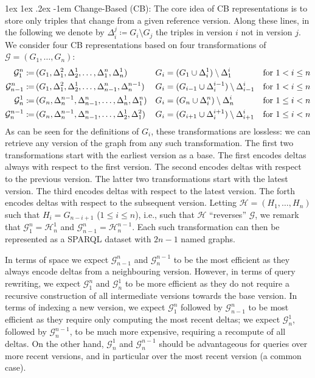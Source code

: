 \documentclass{llncs}
\makeatletter
\renewcommand\paragraph{\@startsection{paragraph}{4}{\z@}%
	{1ex \@plus1ex \@minus.2ex}%
	{-1em}%
	{\normalfont\normalsize\itshape}}
\newcommand{\da}{\ensuremath{:\nolinebreak\mkern-1.2mu\nolinebreak=}}
\makeatother
\begin{document}
\paragraph{Change-Based (CB):} The core idea of CB representations is to store only triples that change from a given reference version. Along these lines, in the following we denote by $\Delta_{i}^j \coloneqq G_i \setminus G_j$ the triples in version $i$ not in version $j$. We consider four CB representations based on four transformations of $\mathcal{G} = (G_1,\ldots,G_n)$:
%
{\footnotesize
\begin{align*}
\mathcal{G}^n_1 \da\,& (G_1,\Delta_1^2,\Delta_2^1,\ldots,\Delta_1^n,\Delta_n^1) & G_i & = (G_1 \cup \Delta_i^1) \setminus \Delta_1^i & \text{for }1 < i \leq n\\
\mathcal{G}^n_{n-1} \da\,& (G_1,\Delta_1^2,\Delta_2^1,\ldots,\Delta_{n-1}^n,\Delta_n^{n-1}) & G_i & = (G_{i-1} \cup \Delta_i^{i-1}) \setminus \Delta_{i-1}^i & \text{for }1 < i \leq n \\
\mathcal{G}^1_n \da\,& (G_n,\Delta_n^{n-1},\Delta_{n-1}^n,\ldots,\Delta_n^1,\Delta_1^n) & G_i & = (G_n \cup \Delta_i^n) \setminus \Delta_n^i & \text{for }1 \leq i < n \\
\mathcal{G}^{n-1}_n \da\,& (G_n,\Delta_n^{n-1},\Delta_{n-1}^n,\ldots,\Delta_2^1,\Delta_1^2) & G_i & = (G_{i+1} \cup \Delta_i^{i+1}) \setminus \Delta_{i+1}^i & \text{for }1 \leq i < n
\end{align*}%
}%
%
As can be seen for the definitions of $G_i$, these transformations are lossless: we can retrieve any version of the graph from any such transformation. The first two transformations start with the earliest version as a base. The first encodes deltas always with respect to the first version. The second encodes deltas with respect to the previous version. The latter two transformations start with the latest version. The third encodes deltas with respect to the latest version. The forth encodes deltas with respect to the subsequent version. Letting $\mathcal{H} = (H_1,\ldots,H_n)$ such that $H_i = G_{n-i+1}$ ($1 \leq i \leq n$), i.e., such that $\mathcal{H}$ ``reverses'' $\mathcal{G}$, we remark that $\mathcal{G}^n_1 = \mathcal{H}^1_n$ and $\mathcal{G}^n_{n-1} = \mathcal{H}^{n-1}_n$. Each such transformation can then be represented as a SPARQL dataset with $2n - 1$ named graphs.

In terms of space we expect $\mathcal{G}^n_{n-1}$ and $\mathcal{G}^{n-1}_n$ to be the most efficient as they always encode deltas from a neighbouring version. However, in terms of query rewriting, we expect $\mathcal{G}^n_{1}$ and $\mathcal{G}^{1}_n$ to be more efficient as they do not require a recursive construction of all intermediate versions towards the base version. In terms of indexing a new version, we expect $\mathcal{G}^{n}_1$ followed by $\mathcal{G}^{n}_{n-1}$ to be most efficient as they require only computing the most recent deltas; we expect $\mathcal{G}^{1}_n$, followed by $\mathcal{G}^{n-1}_{n}$, to be much more expensive, requiring a recompute of all deltas. On the other hand, $\mathcal{G}^{1}_n$ and $\mathcal{G}^{n-1}_{n}$ should be advantageous for queries over more recent versions, and in particular over the most recent version (a common case).
\end{document}
